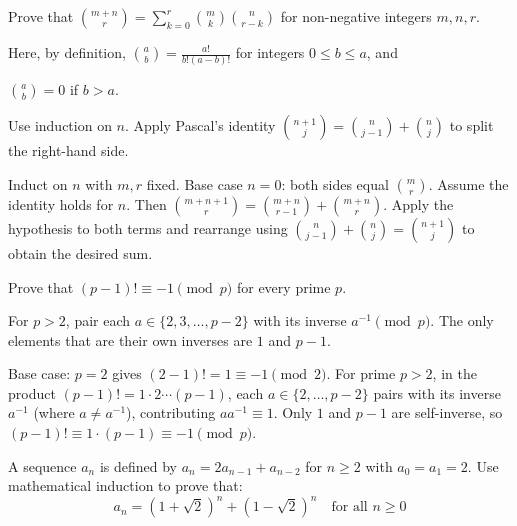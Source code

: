 \begin{problem}
Prove that $\binom{m+n}{r} = \sum_{k=0}^{r} \binom{m}{k}\binom{n}{r-k}$ 
for non-negative integers $m,n,r$.

Here, by definition, $\binom{a}{b} = \frac{a!}{b!(a-b)!}$ for integers $0 \le b \le a$, and

$\binom{a}{b} = 0$ if $b > a$. 

\end{problem}

\begin{hint}
Use induction on $n$. Apply Pascal's identity $\binom{n+1}{j} = \binom{n}{j-1} + \binom{n}{j}$ to split the right-hand side.
\end{hint}

\begin{solution}[Sketch]
Induct on $n$ with $m,r$ fixed. Base case $n=0$: both sides equal $\binom{m}{r}$. Assume the identity holds for $n$. Then $\binom{m+n+1}{r} = \binom{m+n}{r-1} + \binom{m+n}{r}$. Apply the hypothesis to both terms and rearrange using $\binom{n}{j-1} + \binom{n}{j} = \binom{n+1}{j}$ to obtain the desired sum.
\end{solution}

\begin{problem}
Prove that $(p-1)! \equiv -1 \pmod{p}$ for every prime $p$.
\end{problem}

\begin{hint}
For $p>2$, pair each $a \in \{2,3,\ldots,p-2\}$ with its inverse $a^{-1} \pmod{p}$. The only elements that are their own inverses are $1$ and $p-1$.
\end{hint}

\begin{solution}[Sketch]
Base case: $p=2$ gives $(2-1)! = 1 \equiv -1 \pmod{2}$. For prime $p>2$, in the product $(p-1)! = 1 \cdot 2 \cdots (p-1)$, each $a \in \{2,\ldots,p-2\}$ pairs with its inverse $a^{-1}$ (where $a \neq a^{-1}$), contributing $aa^{-1} \equiv 1$. Only $1$ and $p-1$ are self-inverse, so $(p-1)! \equiv 1 \cdot (p-1) \equiv -1 \pmod{p}$.
\end{solution}

\begin{problem}
A sequence $a_n$ is defined by $a_n = 2a_{n-1} + a_{n-2}$ for $n \ge 2$ with $a_0 = a_1 = 2$. Use mathematical induction to prove that:
\[a_n = (1+\sqrt{2})^n + (1-\sqrt{2})^n \quad \text{for all } n \ge 0\]
\end{problem}

